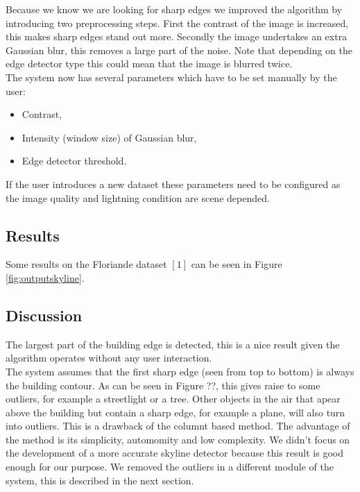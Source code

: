 Because we know we are looking for sharp edges we improved the algorithm by
introducing two preprocessing steps. First the contrast of the image is
increased, this makes sharp edges stand out more.  Secondly the image undertakes
an extra Gaussian blur, this removes a large part of the noise. Note that
depending on the edge detector type this could mean that the image is blurred
twice.\\


The system now has several parameters which have to be set manually by the user:
\begin{itemize}
	\item Contrast,
	\item Intensity (window size) of Gaussian blur,
	\item Edge detector threshold.
\end{itemize}

If the user introduces a new dataset these parameters need to be configured
as the image quality and lightning condition are scene depended.


\subsection{Results}%
Some results on the Floriande dataset $[1]$ can be seen in Figure \ref{fig:outputskyline}.



\subsection{Discussion}  %
The largest part of the building edge is detected, this is a nice result given
the algorithm operates without any user interaction.\\
The system assumes that the first sharp edge (seen from top to bottom) is always
the building contour. As can be seen in Figure ??, this gives raise to some
outliers, for example a streetlight or a tree. 
Other objects in the air that apear above the building but contain a sharp edge,
for example a plane, will also turn into outliers.  This is a drawback of the
	columnt based method.
The advantage of the method is its simplicity, automomity and low complexity.
We didn't focus on the development of a more accurate skyline detector because
this result is good enough for our purpose. We removed the outliers in a
different module of the system, this is described in the next section.  

